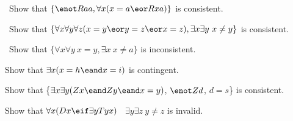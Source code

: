 \problempart
\label{pr.IdentityModels}
\begin{earg}
\item\leftsolutions\ Show that $\{{\enot}Raa, \forall x (x=a \eor Rxa)\}$
is consistent.
\item\leftsolutions\ Show that $\{\forall x\forall y\forall z(x=y \eor y=z \eor x=z),
\exists x\exists y\ x\neq y\}$ is consistent.
\item\leftsolutions\ Show that $\{\forall x\forall y\ x=y, \exists x\ x \neq a\}$ is inconsistent.
\item Show that $\exists x (x = h \eand x = i)$ is contingent.
\item Show that \{$\exists x\exists y(Zx \eand Zy \eand x=y)$, $\enot Zd$, $d=s$\} is consistent.
\item Show that $\forall x(Dx \eif \exists y Tyx)$ \therefore\ $\exists y \exists z\ y\neq z$ is invalid.
\end{earg}




%
%
